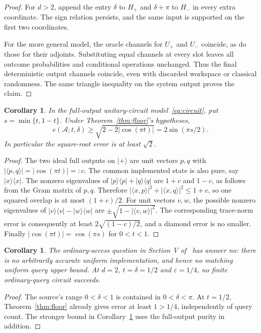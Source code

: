 \documentclass[11pt]{article}
\newtheorem{corollary}[theorem]{Corollary}
\newcommand{\A}{\mathcal A}
\newcommand{\ket}[1]{\lvert #1\rangle}
\newcommand{\bra}[1]{\langle #1\rvert}
\begin{document}
\begin{proof}
For $d>2$, append the entry $\delta$ to $H_+$ and $\delta+\pi$ to $H_-$
in every extra coordinate. The sign relation persists, and the same
input is supported on the first two coordinates.

For the more general model, the oracle channels for $U_+$ and $U_-$
coincide, as do those for their adjoints. Substituting equal channels
at every slot leaves all outcome probabilities and conditional operations
unchanged. Thus the final deterministic output channels coincide, even
with discarded workspace or classical randomness. The same triangle
inequality on the system output proves the claim.
\end{proof}

\begin{corollary}\label{cor:pure}
In the full-output unitary-circuit model~\eqref{eq:circuit}, put
$s=\min\{t,1-t\}$. Under Theorem~\ref{thm:floor}'s hypotheses,
\[
 e(\A;t,\delta)\geq \sqrt{2-2|\cos(\pi t)|}
 =2\sin(\pi s/2).
\]
In particular the square-root error is at least $\sqrt2$.
\end{corollary}
\begin{proof}
The two ideal full outputs on $\ket+$ are unit vectors $p,q$ with
$|\langle p,q\rangle|=|\cos(\pi t)|=:c$.
The common implemented state is also pure, say $\ket x\bra x$.
The nonzero eigenvalues of $\ket p\bra p+\ket q\bra q$ are $1+c$ and
$1-c$, as follows from the Gram matrix of $p,q$.
Therefore
$|\langle x,p\rangle|^2+|\langle x,q\rangle|^2\leq1+c$,
so one squared overlap is at most $(1+c)/2$.
For unit vectors $v,w$, the possible nonzero eigenvalues of
$\ket v\bra v-\ket w\bra w$ are
$\pm\sqrt{1-|\langle v,w\rangle|^2}$.
The corresponding trace-norm error is consequently at least
$2\sqrt{(1-c)/2}$, and a diamond error is no smaller.
Finally $|\cos(\pi t)|=\cos(\pi s)$ for $0<t<1$.
\end{proof}

\begin{corollary}\label{cor:source}
The ordinary-access question in Section V of~\cite{liu} has answer no:
there is no arbitrarily accurate uniform implementation, and hence no
matching uniform query upper bound. At $d=2$, $t=\delta=1/2$ and
$\varepsilon=1/4$, no finite ordinary-query circuit succeeds.
\end{corollary}
\begin{proof}
The source's range $0<\delta<1$ is contained in $0<\delta<\pi$.
At $t=1/2$, Theorem~\ref{thm:floor} already gives error at least $1>1/4$,
independently of query count. The stronger bound in Corollary~\ref{cor:pure}
uses the full-output purity in addition.
\end{proof}
\end{document}

